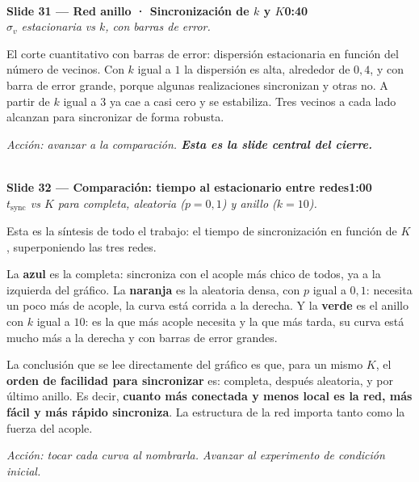 \documentclass[11pt]{article}
\newcommand{\slide}[3]{%
  \vspace{6pt}%
  \noindent{\color{azulOscuro}\rule{3.2cm}{2pt}}\\[2pt]
  \noindent\textbf{\color{azulOscuro}#1}\hfill\textbf{\color{azulMedio}#3}\\[-2pt]
  {\small\color{grisTexto}\itshape #2}\\[2pt]
}
\begin{document}
\slide{Slide 31 — Red anillo · Sincronización de $k$ y $K$}{$\sigma_v$ estacionaria vs $k$, con barras de error.}{0:40}
\begin{guion}
El corte cuantitativo con barras de error: dispersión estacionaria en función del número de vecinos. Con $k$ igual a $1$ la dispersión es alta, alrededor de $0{,}4$, y con barra de error grande, porque algunas realizaciones sincronizan y otras no. A partir de $k$ igual a $3$ ya cae a casi cero y se estabiliza. Tres vecinos a cada lado alcanzan para sincronizar de forma robusta.
\end{guion}
\textit{Acción: avanzar a la comparación. \textbf{Esta es la slide central del cierre.}}

\slide{Slide 32 — Comparación: tiempo al estacionario entre redes}{$t_{\text{sync}}$ vs $K$ para completa, aleatoria ($p=0{,}1$) y anillo ($k=10$).}{1:00}
\begin{guion}
Esta es la síntesis de todo el trabajo: el tiempo de sincronización en función de $K$, superponiendo las tres redes.

La \textbf{azul} es la completa: sincroniza con el acople más chico de todos, ya a la izquierda del gráfico. La \textbf{naranja} es la aleatoria densa, con $p$ igual a $0{,}1$: necesita un poco más de acople, la curva está corrida a la derecha. Y la \textbf{verde} es el anillo con $k$ igual a $10$: es la que más acople necesita y la que más tarda, su curva está mucho más a la derecha y con barras de error grandes.

La conclusión que se lee directamente del gráfico es que, para un mismo $K$, el \textbf{orden de facilidad para sincronizar} es: completa, después aleatoria, y por último anillo. Es decir, \textbf{cuanto más conectada y menos local es la red, más fácil y más rápido sincroniza}. La estructura de la red importa tanto como la fuerza del acople.
\end{guion}
\textit{Acción: tocar cada curva al nombrarla. Avanzar al experimento de condición inicial.}
\end{document}
